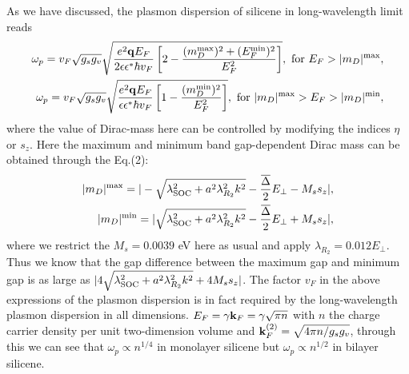\documentclass[UTF8,a4paper]{article}
\begin{document}
\begin{large}
As we have discussed\cite{Wu C H3,XX,Wu C H_3}, the plasmon dispersion of silicene in long-wavelength limit reads
\begin{equation} 
\begin{aligned}
\omega_{p}=v_{F}\sqrt{g_{s}g_{v}}\sqrt{\frac{e^{2}{\bf q}E_{F}}{2\epsilon\epsilon^{*}\hbar v_{F}}\left[2-\frac{( m_{D}^{{\rm max}})^{2}+( E_{F}^{{\rm min}})^{2}}{E_{F}^{2}}\right]},\ {\rm for}\ 
E_{F}> |m_{D}|^{{\rm max}},\\
\omega_{p}=v_{F}\sqrt{g_{s}g_{v}}\sqrt{\frac{e^{2}{\bf q}E_{F}}{\epsilon\epsilon^{*}\hbar v_{F}}\left[1-\frac{( m_{D}^{{\rm min}})^{2}}{E_{F}^{2}}\right]},\ {\rm for}\ 
 |m_{D}|^{{\rm max}}>E_{F}> |m_{D}|^{{\rm min}},
\end{aligned}
\end{equation}
where the value of Dirac-mass here can be controlled by modifying the indices $\eta$ or $s_{z}$.
Here the maximum and minimum band gap-dependent Dirac mass can be obtained through the Eq.(2):
\begin{equation} 
\begin{aligned}
|m_{D}|^{{\rm max}}=
|-\sqrt{\lambda_{{\rm SOC}}^{2}+a^{2}\lambda^{2}_{R_{2}}k^{2}}-\frac{\overline{\Delta}}{2}E_{\perp}-M_{s}s_{z}|,\\
|m_{D}|^{{\rm min}}=
|\sqrt{\lambda_{{\rm SOC}}^{2}+a^{2}\lambda^{2}_{R_{2}}k^{2}}-\frac{\overline{\Delta}}{2}E_{\perp}+M_{s}s_{z}|,\\
\end{aligned}
\end{equation}
where we restrict the $M_{s}=0.0039$ eV here as usual and apply $\lambda_{R_{2}}=0.012E_{\perp}$.
Thus we know that the gap difference between the maximum gap and minimum gap 
is as large as
$|4\sqrt{\lambda_{{\rm SOC}}^{2}+a^{2}\lambda^{2}_{R_{2}}k^{2}}+4M_{s}s_{z}|$.
The factor $v_{F}$ in the above expressions of the plasmon dispersion 
is in fact required by the long-wavelength plasmon dispersion in all dimensions\cite{Sarma S D,Stern F}.
$E_{F}=\gamma{\bf k}_{F}=\gamma\sqrt{\pi n}$ with $n$ the charge carrier density per unit two-dimension volume
and ${\bf k}_{F}^{(2)}=\sqrt{4\pi n/g_{s}g_{v}}$,
through this we can see that $\omega_{p}\propto n^{1/4}$ in monolayer silicene but $\omega_{p}\propto n^{1/2}$ in bilayer silicene.

\end{large}
\end{document}
